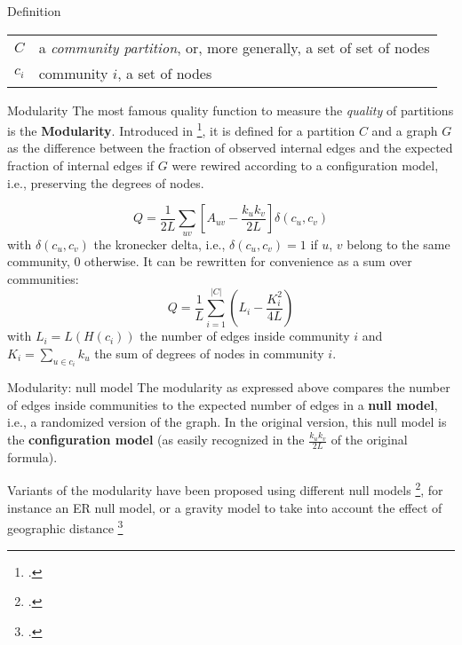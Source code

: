 \begin{textbox}{Definition}
    \begin{tabular}{p{}|p{}}\scriptsize

        $C$   & a \textit{community partition}, or, more generally, a set of set of nodes \\
        $c_i$ & community $i$, a set of nodes                                             \\
    \end{tabular}
\end{textbox}


\begin{textbox}{Modularity}
    The most famous quality function to measure the \textit{quality} of partitions is the \textbf{Modularity}. Introduced in \footcite{girvan2002community}, it is defined for a partition $C$ and a graph $G$ as the difference between the fraction of observed internal edges and the expected fraction of internal edges if $G$ were rewired according to a configuration model, i.e., preserving the degrees of nodes.

    \[
        Q=\frac{1}{2L}\sum_{uv}\left[ A_{uv}-\frac{k_uk_v}{2L}\right] \delta(c_u,c_v)
    \]
    with $\delta(c_u,c_v)$ the kronecker delta, i.e., $\delta(c_u,c_v)=1$ if $u$, $v$ belong to the same community, 0 otherwise.
    It can be rewritten for convenience as a sum over communities:
    \[
        Q=\frac{1}{L}\sum_{i=1}^{|C|}(L_{i}-\frac{K_i^2}{4L})
    \]
    with $L_{i}=L(H(c_i))$ the number of edges inside community $i$ and $K_i=\sum_{u \in c_i}k_u$ the sum of degrees of nodes in community $i$.
\end{textbox}

\begin{textbox}{Modularity: null model}
    The modularity as expressed above compares the number of edges inside communities to the expected number of edges in a \textbf{null model}, i.e., a randomized version of the graph. In the original version, this null model is the \textbf{configuration model} (as easily recognized in the $\frac{k_uk_v}{2L}$ of the original formula).

    Variants of the modularity have been proposed using different null models \footcite{jutla2011generalized}, for instance an ER null model, or a gravity model to take into account the effect of geographic distance \footcite{expert2011uncovering}
\end{textbox}


